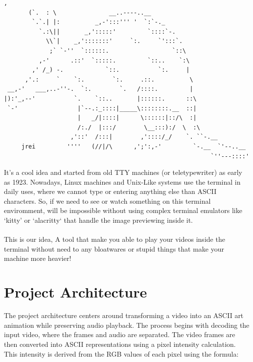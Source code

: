 \documentclass[a4paper,12pt]{article}
\begin{document}
\begin{lstlisting}[caption={An ASCII art for Ant bear from https://www.asciiart.eu/animals/aardvarks}]
            ,
       (`.  : \               __..----..__
        `.`.| |:          _,-':::''' '  `:`-._
          `.:\||       _,':::::'         `::::`-.
            \\`|    _,':::::::'     `:.     `':::`.
             ;` `-''  `::::::.                  `::\
          ,-'      .::'  `:::::.         `::..    `:\
        ,' /_) -.            `::.           `:.     |
      ,'.:     `    `:.        `:.     .::.          \
 __,-'   ___,..-''-.  `:.        `.   /::::.         |
|):'_,--'           `.    `::..       |::::::.      ::\
 `-'                 |`--.:_::::|_____\::::::::.__  ::|
                     |   _/|::::|      \::::::|::/\  :|
                     /:./  |:::/        \__:::):/  \  :\
                   ,'::'  /:::|        ,'::::/_/    `. ``-.__
     jrei         ''''   (//|/\      ,';':,-'         `-.__  `'--..__
                                                           `''---::::'

\end{lstlisting}


It's a cool idea and started from old TTY machines (or teletypewriter) as early as 1923. Nowadays, Linux machines and Unix-Like systems use the terminal in daily uses, where we cannot type or entering anything else than ASCII characters. So, if we need to see or watch something on this terminal enviromment, will be impossible without using complex terminal emulators like `kitty' or `alacritty` that handle the image previewing inside it. \\ \\
This is our idea, A tool that make you able to play your videos inside the terminal without need to any bloatwares or stupid things that make your machine more heavier!

\section{Project Architecture}

The project architecture centers around transforming a video into an ASCII art animation while preserving audio playback. The process begins with decoding the input video, where the frames and audio are separated. The video frames are then converted into ASCII representations using a pixel intensity calculation. This intensity is derived from the RGB values of each pixel using the formula:
\end{document}
